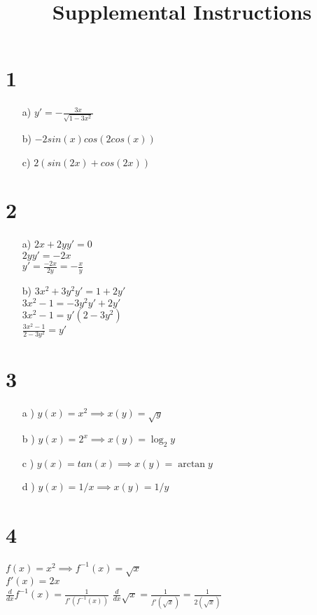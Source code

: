 \documentclass{article}
\title{Supplemental Instructions}
\date{
     }
\begin{document}
\maketitle

\section*{1}
\begin{itemize}
    \item[a) ] $y' = - \frac{3x}{\sqrt{1-3x^2}}$
    \item[b) ] $-2 sin(x) cos(2 cos(x))$
    \item[c) ] $2(sin(2x) + cos(2x))$
\end{itemize}

\section*{2}
\begin{itemize}
    \item[a) ] 
    $2x + 2y y' = 0$ \\
    $2y y' = -2x$ \\
    $y' = \frac{-2x}{2y} = - \frac{x}{y}$
    
    \item[b) ]
    $3x^2 + 3y^2 y' = 1 + 2 y' $ \\
    $3x^2 - 1 = - 3y^2 y' + 2 y' $ \\    
    $3x^2 - 1 = y' ( 2 - 3y^2   ) $ \\  
    $\frac{3x^2 - 1}{ 2 - 3y^2  } = y'  $ \\
    
    
\end{itemize}
\section*{3}
\begin{itemize}
\item[a )] $y(x) = x^{2} \implies x(y) = \sqrt{y}$
\item[b )] $y(x) = 2^{x} \implies x(y) = \log_{2}{y}$
\item[c )] $y(x) = tan(x) \implies x(y) = \arctan{y}$
\item[d )] $y(x) = 1/x \implies x(y) = 1/y$
\end{itemize}

\section*{4}
$f(x) = x^2 \implies f^{-1}(x)=  \sqrt{x}$ \\
$f'(x) = 2x$ \\
$\frac{d}{dx} f^{-1}(x) = \frac{1}{f'(f^{-1}(x))}$
$\frac{d}{dx} \sqrt{x} = \frac{1}{f'(\sqrt{x})} = \frac{1}{2(\sqrt{x})}$
\end{document}
